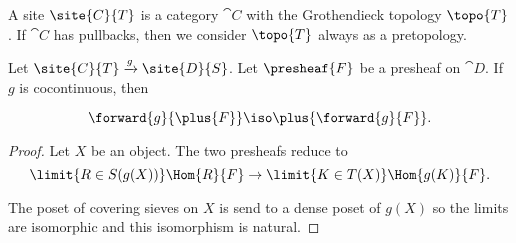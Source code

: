 \begin{definition}
A site $\site{C}{T}$ is a category $\cat{C}$ with the Grothendieck topology $\topo{T}$.
If $\cat{C}$ has pullbacks, then we consider $\topo{T}$ always as a pretopology.
\end{definition}

\begin{definition}


\end{definition}

\begin{lemma}
Let $\site{C}{T}\xrightarrow{g} \site{D}{S}$. Let $\presheaf{F}$ be a presheaf on $\cat{D}$.
If $g$ is cocontinuous, then 

\[\forward{g}{\plus{F}} \iso \plus{\forward{g}{F}}.\]
\end{lemma}
\begin{proof}
Let $X$ be an object.
The two presheafs reduce to
\[ \limit{R\in S(g(X))} \Hom{R}{F} \rightarrow \limit{K\in T(X)} \Hom{g(K)}{F}.\]

The poset of covering sieves on $X$ is send to a dense
poset of $g(X)$ so the limits are isomorphic and this isomorphism is natural.
\end{proof}
